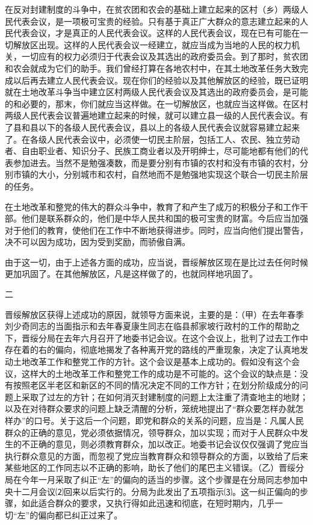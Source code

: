 \documentclass[UTF-8, a5paper, 12pt]{ctexart}
\begin{document}
在反对封建制度的斗争中，在贫农团和农会的基础上建立起来的区村（乡）两级人民代表会议，是一项极可宝贵的经验。只有基于真正广大群众的意志建立起来的人民代表会议，才是真正的人民代表会议。这样的人民代表会议，现在已有可能在一切解放区出现。这样的人民代表会议一经建立，就应当成为当地的人民的权力机关，一切应有的权力必须归于代表会议及其选出的政府委员会。到了那时，贫农团和农会就成为它们的助手。我们曾经打算在各地农村中，在其土地改革任务大致完成以后再去建立人民代表会议。现在你们的经验以及其他解放区的经验，既已证明就在土地改革斗争当中建立区村两级人民代表会议及其选出的政府委员会，是可能的和必要的，那末，你们就应当这样做。在一切解放区，也就应当这样做。在区村两级人民代表会议普遍地建立起来的时候，就可以建立县一级的人民代表会议。有了县和县以下的各级人民代表会议，县以上的各级人民代表会议就容易建立起来了。在各级人民代表会议中，必须使一切民主阶层，包括工人、农民、独立劳动者、自由职业者、知识分子、民族工商业者以及开明绅士，尽可能地都有他们的代表参加进去。当然不是勉强凑数，而是要分别有市镇的农村和没有市镇的农村，分别市镇的大小，分别城市和农村，自然地而不是勉强地实现这个联合一切民主阶层的任务。

在土地改革和整党的伟大的群众斗争中，教育了和产生了成万的积极分子和工作干部。他们是联系群众的，他们是中华人民共和国的极可宝贵的财富。今后应当加强对于他们的教育，使他们在工作中不断地获得进步。同时，应当向他们提出警告，决不可以因为成功，因为受到奖励，而骄傲自满。

由于这一切，由于上述各方面的成功，应当说，晋绥解放区现在是比过去任何时候更加巩固了。在其他解放区，凡是这样做了的，也就同样地巩固了。

二

晋绥解放区获得上述成功的原因，就领导方面来说，主要的是：（甲）在去年春季刘少奇同志的当面指示和去年春夏康生同志在临县郝家坡行政村的工作的帮助之下，晋绥分局在去年六月召开了地委书记会议。在这个会议上，批判了过去工作中存在着的右的偏向，彻底地揭发了各种离开党的路线的严重现象，决定了认真地发动土地改革工作和整党工作的方针。这个会议是基本上成功的。假如没有这个会议，这样大的土地改革工作和整党工作的成功是不可能的。这个会议的缺点是：没有按照老区半老区和新区的不同的情况决定不同的工作方针；在划分阶级成分的问题上采取了过左的方针；在如何消灭封建制度的问题上太注重了清查地主的地财；以及在对待群众要求的问题上缺乏清醒的分析，笼统地提出了“群众要怎样办就怎样办”的口号。关于这后一个问题，即党和群众的关系的问题，应当是：凡属人民群众的正确的意见，党必须依据情况，领导群众，加以实现；而对于人民群众中发生的不正确的意见，则必须教育群众，加以改正。地委书记会议仅仅强调了党应当执行群众意见的方面，而忽视了党应当教育群众和领导群众的方面，以致给了后来某些地区的工作同志以不正确的影响，助长了他们的尾巴主义错误。（乙）晋绥分局在今年一月采取了纠正“左”的偏向的适当的步骤。这个步骤是在分局同志参加中央十二月会议⑵回来以后实行的。分局为此发出了五项指示⑶。这一纠正偏向的步骤，如此适合群众的要求，又执行得如此迅速和彻底，在短时期内，几乎一切“左”的偏向都已纠正过来了。
\end{document}
